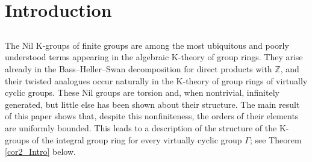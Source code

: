 \documentclass[reqno,11pt,letterpaper]{amsart}
\theoremstyle{plain}
\numberwithin{equation}{subsection}
\theoremstyle{remark}
\theoremstyle{plain}
\theoremstyle{definition}\newtheorem*{notation}{Notation}
\newcommand{\RK}{\mathrm{K}}
\newcommand{\RNK}{\mathrm{NK}}
\newcommand{\BZ}{\mathbb{Z}}
\begin{document}
\begin{abstract}


We show that for every finite group $G$ and every integer $n$, the Nil group $\RNK_n(\BZ[G])$ of the integral group ring
 of $G$ has finite exponent, and give a bound depending on $n$ and the order $|G|$. This bound is explicit when 
  every prime divisor of $|G|$ is at least $3+n/2$.
 More generally, our finite exponent result applies to $\RNK_n(R[G])$   whenever $R$ is a regular, torsion-free, Noetherian commutative ring such that $R/p$ is regular for every prime $p$ that divides $|G|$.
 In the  Appendix, M. Morrow 
provides an alternative approach and also shows that 
the Nil group $\RNK_n(X)$ of an excellent Noetherian scheme $X$, with $X[1/p]$ regular,
is annihilated by a finite power of $p$, provided $X$ admits a suitable resolution of singularities. 
By extending his argument to certain noncommutative rings, we also show that, for $R$ as above and $\alpha$ any automorphism of $G$, the Farrell Nil groups $\RNK_n(R[G],\alpha)$ have finite exponent. As a consequence, for every virtually cyclic group $\Gamma$, the group $\RK_n(\BZ[\Gamma])$ is a direct sum of a finitely generated abelian group and an infinite countable direct sum of copies of a finite abelian group.
\end{abstract}
 
 \maketitle

\tableofcontents
 
   \maketitle


 
\date{\today}
 
  
 
 \section{Introduction} 
 
 \subsection{}  
 
The Nil $\RK$-groups of finite groups are among the most ubiquitous and poorly understood terms appearing in the algebraic $\RK$-theory of group rings. They arise already in the Bass–Heller–Swan decomposition for direct products with $\BZ$, and their twisted analogues occur naturally in the
 $\RK$-theory of group rings of virtually cyclic groups. These Nil groups are torsion and, when nontrivial, infinitely generated, but little else has been shown about their structure. The main result of this paper shows that, despite this nonfiniteness, the orders of their elements are uniformly bounded.
This leads to a description of the structure of the $\RK$-groups of the integral group ring  for every virtually cyclic group $\Gamma$; see Theorem \ref{cor2_Intro} below.
 
\end{document}
